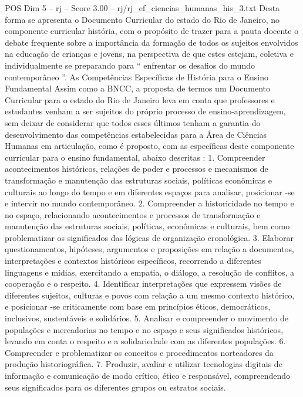 \begin{textsample}{POS Dim 5 – rj – Score 3.00 – rj/rj\_ef\_ciencias\_humanas\_his\_3.txt}
Desta forma se apresenta o Documento Curricular do estado do Rio de Janeiro, no componente curricular história, com o propósito de trazer para a pauta docente o debate frequente sobre a importância da formação de todos os sujeitos envolvidos na educação de crianças e jovens, na perspectiva de que estes estejam, coletiva e individualmente se preparando para “ enfrentar os desafios do mundo contemporâneo ”.
As Competências Específicas de História para o Ensino Fundamental Assim como a BNCC, a proposta de termos um Documento Curricular para o estado do Rio de Janeiro leva em conta que professores e estudantes venham a ser sujeitos do próprio processo de ensino-aprendizagem, sem deixar de considerar que todos esses últimos tenham a garantia do desenvolvimento das competências estabelecidas para a Área de Ciências Humanas em articulação, como é proposto, com as específicas deste componente curricular para o ensino fundamental, abaixo descritas : 1.
Compreender acontecimentos históricos, relações de poder e processos e mecanismos de transformação e manutenção das estruturas sociais, políticas econômicas e culturais ao longo do tempo e em diferentes espaços para analisar, posicionar -se e intervir no mundo contemporâneo. 2.
Compreender a historicidade no tempo e no espaço, relacionando acontecimentos e processos de transformação e manutenção das estruturas sociais, políticas, econômicas e culturais, bem como problematizar os significados das lógicas de organização cronológica. 3.
Elaborar questionamentos, hipóteses, argumentos e proposições em relação a documentos, interpretações e contextos históricos específicos, recorrendo a diferentes linguagens e mídias, exercitando a empatia, o diálogo, a resolução de conflitos, a cooperação e o respeito. 4.
Identificar interpretações que expressem visões de diferentes sujeitos, culturas e povos com relação a um mesmo contexto histórico, e posicionar -se criticamente com base em princípios éticos, democráticos, inclusivos, sustentáveis e solidários. 5.
Analisar e compreender o movimento de populações e mercadorias no tempo e no espaço e seus significados históricos, levando em conta o respeito e a solidariedade com as diferentes populações. 6.
Compreender e problematizar os conceitos e procedimentos norteadores da produção historiográfica. 7.
Produzir, avaliar e utilizar tecnologias digitais de informação e comunicação de modo crítico, ético e responsável, compreendendo seus significados para os diferentes grupos ou estratos sociais.

\end{textsample}
